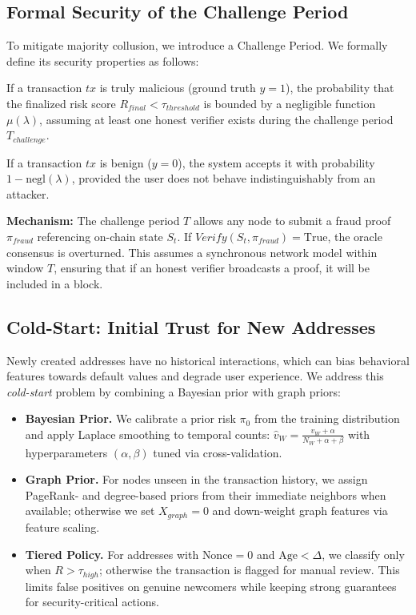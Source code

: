 \subsection{Formal Security of the Challenge Period}
To mitigate majority collusion, we introduce a Challenge Period. We formally define its security properties as follows:

\begin{definition}
If a transaction $tx$ is truly malicious (ground truth $y=1$), the probability that the finalized risk score $R_{final} < \tau_{threshold}$ is bounded by a negligible function $\mu(\lambda)$, assuming at least one honest verifier exists during the challenge period $T_{challenge}$.
\end{definition}

\begin{definition}[Completeness]
If a transaction $tx$ is benign ($y=0$), the system accepts it with probability $1 - \text{negl}(\lambda)$, provided the user does not behave indistinguishably from an attacker.
\end{definition}

\textbf{Mechanism:} The challenge period $T$ allows any node to submit a fraud proof $\pi_{fraud}$ referencing on-chain state $S_t$. If $Verify(S_t, \pi_{fraud}) = \text{True}$, the oracle consensus is overturned. This assumes a synchronous network model within window $T$, ensuring that if an honest verifier broadcasts a proof, it will be included in a block.

\subsection{Cold-Start: Initial Trust for New Addresses}
Newly created addresses have no historical interactions, which can bias behavioral features towards default values and degrade user experience. We address this \textit{cold-start} problem by combining a Bayesian prior with graph priors:
\begin{itemize}
    \item \textbf{Bayesian Prior.} We calibrate a prior risk $\pi_0$ from the training distribution and apply Laplace smoothing to temporal counts: $\hat{v}_W = \frac{v_W + \alpha}{N_W + \alpha + \beta}$ with hyperparameters $(\alpha,\beta)$ tuned via cross-validation.
    \item \textbf{Graph Prior.} For nodes unseen in the transaction history, we assign PageRank- and degree-based priors from their immediate neighbors when available; otherwise we set $X_{graph}=0$ and down-weight graph features via feature scaling.
    \item \textbf{Tiered Policy.} For addresses with $\text{Nonce}=0$ and $\text{Age}<\Delta$, we classify only when $R>\tau_{high}$; otherwise the transaction is flagged for manual review. This limits false positives on genuine newcomers while keeping strong guarantees for security-critical actions.
\end{itemize}
